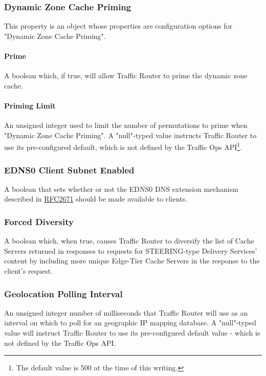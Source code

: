 \subsubsection{Dynamic Zone Cache Priming}
This property is an object whose properties are configuration options for
"Dynamic Zone Cache Priming".

\paragraph{Prime}
A boolean which, if true, will allow Traffic Router to prime the dynamic zone
cache.

\paragraph{Priming Limit}
An unsigned integer used to limit the number of permutations to prime when
"Dynamic Zone Cache Priming". A "null"-typed value instructs Traffic Router to
use its pre-configured default, which is not defined by the Traffic Ops
API\footnote{The default value is 500 at the time of this writing.}.

\subsubsection{EDNS0 Client Subnet Enabled}
A boolean that sets whether or not the EDNS0 DNS extension mechanism described
in \href{https://tools.ietf.org/html/rfc2671}{RFC2671} should be made available
to clients.

\subsubsection{Forced Diversity}
A boolean which, when true, causes Traffic Router to diversify the list of Cache
Servers returned in responses to requests for STEERING-type Delivery Services'
content by including more unique Edge-Tier Cache Servers in the response to the
client's request.

\subsubsection{Geolocation Polling Interval}
An unsigned integer number of milliseconds that Traffic Router will use as an
interval on which to poll for an geographic IP mapping database. A "null"-typed
value will instruct Traffic Router to use its pre-configured default value -
which is not defined by the Traffic Ops API.

